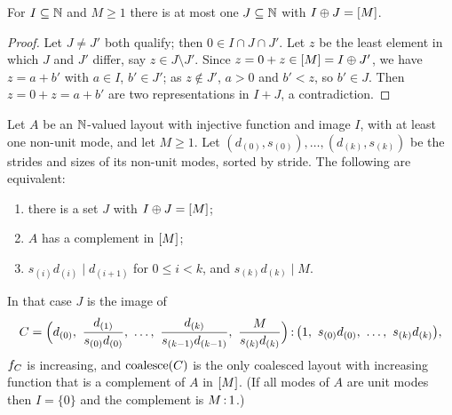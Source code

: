 \begin{proposition}\label{prop:unique-complement}
For $I\subseteq\mathbb{N}$ and $M\ge1$ there is at most one $J\subseteq\mathbb{N}$ with $I\oplus J=[M]$.
\end{proposition}
\begin{proof}
Let $J\neq J'$ both qualify; then $0\in I\cap J\cap J'$. Let $z$ be the least element in which
$J$ and $J'$ differ, say $z\in J\setminus J'$. Since $z=0+z\in[M]=I\oplus J'$, we have $z=a+b'$
with $a\in I$, $b'\in J'$; as $z\notin J'$, $a>0$ and $b'<z$, so $b'\in J$. Then $z=0+z=a+b'$
are two representations in $I+J$, a contradiction.
\end{proof}

\begin{theorem}[complement]\label{thm:complement}
Let $A$ be an $\mathbb{N}$-valued layout with injective function and image $I$, with at least one non-unit
mode, and let $M\ge1$. Let $(d_{(0)},s_{(0)}),\dots,(d_{(k)},s_{(k)})$ be the strides and sizes of
its non-unit modes, sorted by stride. The following are equivalent:
\begin{enumerate}[label=(\roman*),itemsep=1pt]
\item there is a set $J$ with $I\oplus J=[M]$;
\item $A$ has a complement in $[M]$;
\item $s_{(i)}d_{(i)}\mid d_{(i+1)}$ for $0\le i<k$, and $s_{(k)}d_{(k)}\mid M$.
\end{enumerate}
In that case $J$ is the image of
\begin{equation}\label{eq:complement}
 C=\lay{\Bigl(d_{(0)},\ \frac{d_{(1)}}{s_{(0)}d_{(0)}},\ \dots,\ \frac{d_{(k)}}{s_{(k-1)}d_{(k-1)}},\ \frac{M}{s_{(k)}d_{(k)}}\Bigr)}{\bigl(1,\ s_{(0)}d_{(0)},\ \dots,\ s_{(k)}d_{(k)}\bigr)},
\end{equation}
$f_{C}$ is increasing, and $\operatorname{coalesce}(C)$ is the only coalesced layout with increasing function that
is a complement of $A$ in $[M]$. {\rm(}If all modes of $A$ are unit modes then $I=\{0\}$ and the
complement is $M\,{:}\,1$.{\rm)}
\end{theorem}
